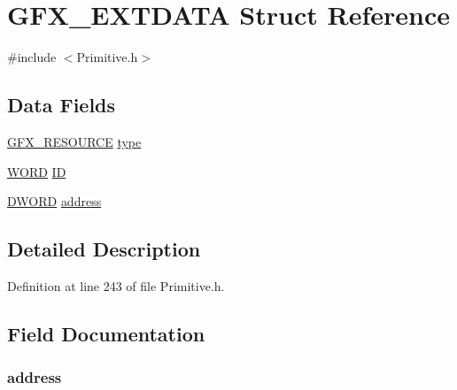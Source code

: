 \hypertarget{struct_g_f_x___e_x_t_d_a_t_a}{}\section{G\+F\+X\+\_\+\+E\+X\+T\+D\+A\+T\+A Struct Reference}
\label{struct_g_f_x___e_x_t_d_a_t_a}


{\ttfamily \#include $<$Primitive.\+h$>$}

\subsection*{Data Fields}
\begin{DoxyCompactItemize}
\item 
\hyperlink{_primitive_8h_a9a3785e6345a6e01071a873d03698baf}{G\+F\+X\+\_\+\+R\+E\+S\+O\+U\+R\+C\+E} \hyperlink{struct_g_f_x___e_x_t_d_a_t_a_ad19c8e0d19c638be9dd81d163454b0f1}{type}
\item 
\hyperlink{_generic_type_defs_8h_a2b0e863dadf920709ec53d9088ee7c91}{W\+O\+R\+D} \hyperlink{struct_g_f_x___e_x_t_d_a_t_a_a79cf9bf3b48476101422d9b453e0945a}{I\+D}
\item 
\hyperlink{_generic_type_defs_8h_ad342ac907eb044443153a22f964bf0af}{D\+W\+O\+R\+D} \hyperlink{struct_g_f_x___e_x_t_d_a_t_a_ac5c3f71d50a709e54201184510194a68}{address}
\end{DoxyCompactItemize}


\subsection{Detailed Description}


Definition at line 243 of file Primitive.\+h.



\subsection{Field Documentation}
\hypertarget{struct_g_f_x___e_x_t_d_a_t_a_ac5c3f71d50a709e54201184510194a68}{}
\subsubsection[{address}]{ address}\label{struct_g_f_x___e_x_t_d_a_t_a_ac5c3f71d50a709e54201184510194a68}


